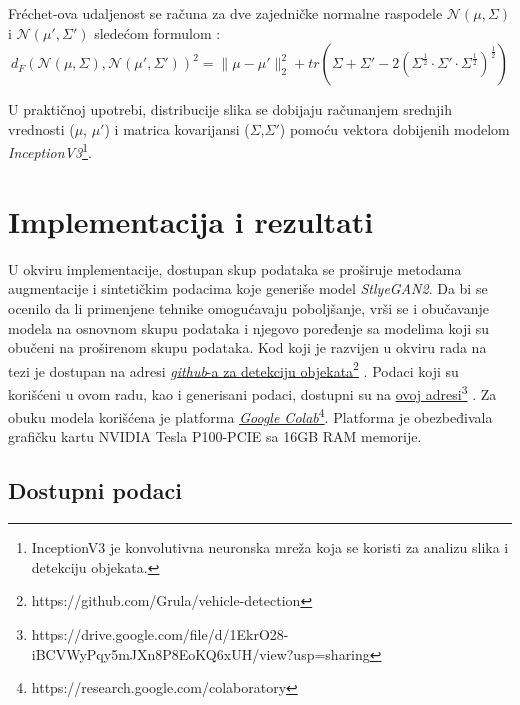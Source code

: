 \documentclass[12pt,oneside]{memoir}
\begin{document}
Fréchet-ova udaljenost se računa za dve zajedničke normalne raspodele \(\mathcal{N}(\mu,\Sigma)\) i \(\mathcal{N}(\mu',\Sigma')\) sledećom formulom \cite{dowson1982frechet}:
\begin{equation}
    d_{F}(\mathcal N(\mu, \Sigma), \mathcal N(\mu', \Sigma'))^2 =
        \| \mu - \mu' \|^{2}_{2} + 
        tr\left(\Sigma + \Sigma' -
        2\left(\Sigma^\frac{1}{2} \cdot \Sigma' \cdot \Sigma^\frac{1}{2} \right)^\frac{1}{2} \right)
\end{equation}

U praktičnoj upotrebi, distribucije slika se dobijaju računanjem srednjih vrednosti (\(\mu\), \(\mu'\)) i matrica kovarijansi (\(\Sigma\),\(\Sigma'\)) pomoću vektora dobijenih modelom \textit{InceptionV3}\footnote{InceptionV3 je konvolutivna neuronska mreža koja se koristi za analizu slika i detekciju objekata.}.


\chapter{Implementacija i rezultati}
\label{section5}

U okviru implementacije, dostupan skup podataka se proširuje metodama augmentacije i sintetičkim podacima koje generiše model \textit{StlyeGAN2}.
Da bi se ocenilo da li primenjene tehnike omogućavaju poboljšanje, vrši se i obučavanje modela na osnovnom skupu podataka i njegovo poređenje sa modelima koji su obučeni na proširenom skupu podataka.
Kod koji je razvijen u okviru rada na tezi je dostupan na adresi  \underline{\href{https://github.com/Grula/vehicle-detection}{\textit{github}-a za detekciju objekata}}\footnote{https://github.com/Grula/vehicle-detection} \cite{vehicleGit2022}. Podaci koji su korišćeni u ovom radu, kao i generisani podaci, dostupni su na \href{https://drive.google.com/file/d/1EkrO28-iBCVWyPqy5mJXn8P8EoKQ6xUH/view?usp=sharing}{\underline{ovoj adresi}}\footnote{https://drive.google.com/file/d/1EkrO28-iBCVWyPqy5mJXn8P8EoKQ6xUH/view?usp=sharing} \cite{vehicleData2022}. Za obuku modela korišćena je platforma \href{https://research.google.com/colaboratory/}{\underline{\textit{Google Colab}}}\footnote{https://research.google.com/colaboratory}. Platforma je obezbeđivala grafičku kartu NVIDIA Tesla P100-PCIE sa 16GB RAM memorije. 


\section{Dostupni podaci}
\end{document}

